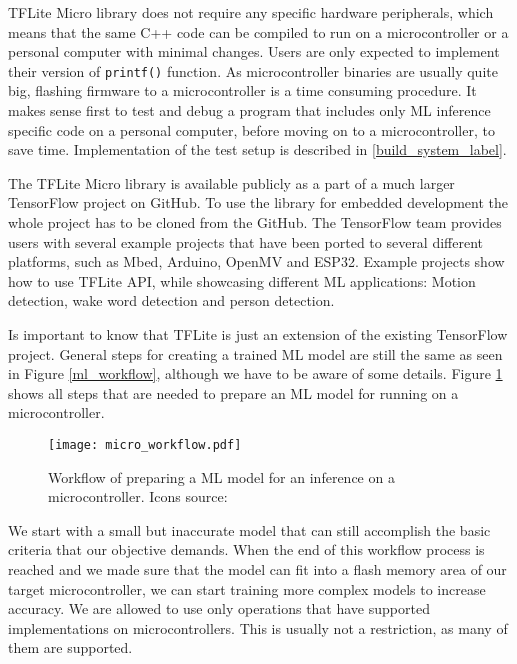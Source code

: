 TFLite Micro library does not require any specific hardware peripherals, which means that the same C++ code can be compiled to run on a microcontroller or a personal computer with minimal changes.
Users are only expected to implement their version of \verb|printf()| function.
As microcontroller binaries are usually quite big, flashing firmware to a microcontroller is a time consuming procedure.
It makes sense first to test and debug a program that includes only ML inference specific code on a personal computer, before moving on to a microcontroller, to save time.
Implementation of the test setup is described in \ref{build_system_label}.

The TFLite Micro library is available publicly as a part of a much larger TensorFlow project on GitHub\cite{tensorflow_github}.
To use the library for embedded development the whole project has to be cloned from the GitHub.
The TensorFlow team provides users with several example projects that have been ported to several different platforms, such as Mbed, Arduino, OpenMV and ESP32.
Example projects show how to use TFLite API, while showcasing different ML applications: Motion detection, wake word detection and person detection.

Is important to know that TFLite is just an extension of the existing TensorFlow project.
General steps for creating a trained ML model are still the same as seen in Figure \ref{ml_workflow}, although we have to be aware of some details.
Figure \ref{micro_workflow} shows all steps that are needed to prepare an ML model for running on a microcontroller.

\begin{figure}[ht] 
    \centering
    \texttt{[image: micro\_workflow.pdf]} 
    \caption[Workflow of preparing an ML model for an inference on a microcontroller.]{Workflow of preparing a ML model for an inference on a microcontroller. Icons source:\cite{icons}}
    \label{micro_workflow}
\end{figure}

We start with a small but inaccurate model that can still accomplish the basic criteria that our objective demands.
When the end of this workflow process is reached and we made sure that the model can fit into a flash memory area of our target microcontroller, we can start training more complex models to increase accuracy.
We are allowed to use only operations that have supported implementations on microcontrollers.
This is usually not a restriction, as many of them are supported.

